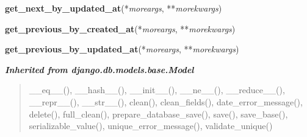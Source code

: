 \hspace{.8\funcindent}\begin{boxedminipage}{\funcwidth}

    \raggedright \textbf{get\_next\_by\_updated\_at}(*\textit{moreargs}, **\textit{morekwargs})

\setlength{\parskip}{2ex}
\setlength{\parskip}{1ex}
    \end{boxedminipage}

    \label{spatio_main:models:Community:get_previous_by_created_at}

    \vspace{0.5ex}

\hspace{.8\funcindent}\begin{boxedminipage}{\funcwidth}

    \raggedright \textbf{get\_previous\_by\_created\_at}(*\textit{moreargs}, **\textit{morekwargs})

\setlength{\parskip}{2ex}
\setlength{\parskip}{1ex}
    \end{boxedminipage}

    \label{spatio_main:models:Community:get_previous_by_updated_at}

    \vspace{0.5ex}

\hspace{.8\funcindent}\begin{boxedminipage}{\funcwidth}

    \raggedright \textbf{get\_previous\_by\_updated\_at}(*\textit{moreargs}, **\textit{morekwargs})

\setlength{\parskip}{2ex}
\setlength{\parskip}{1ex}
    \end{boxedminipage}


\large{\textbf{\textit{Inherited from django.db.models.base.Model}}}

\begin{quote}
\_\_eq\_\_(), \_\_hash\_\_(), \_\_init\_\_(), \_\_ne\_\_(), \_\_reduce\_\_(), \_\_repr\_\_(), \_\_str\_\_(), clean(), clean\_fields(), date\_error\_message(), delete(), full\_clean(), prepare\_database\_save(), save(), save\_base(), serializable\_value(), unique\_error\_message(), validate\_unique()
\end{quote}

